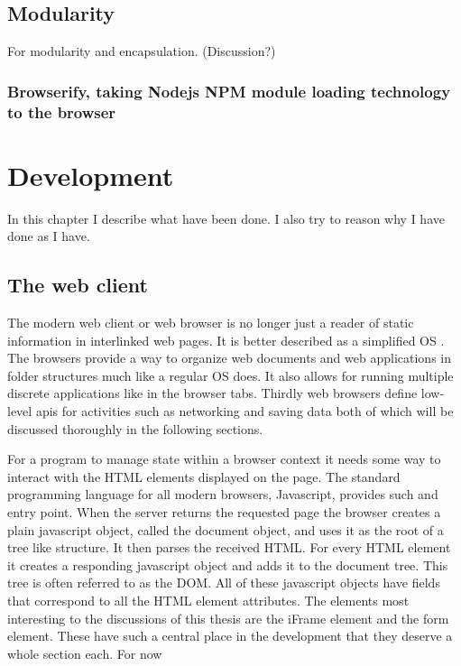\documentclass[english]{ifimaster}
\begin{document}
\section{Modularity}
For modularity and encapsulation. (Discussion?)
\subsection{Browserify, taking Nodejs NPM module loading technology to the browser}

\chapter{Development}
In this chapter I describe what have been done. I also try to reason why I have done as I have.

\section{The web client}
The modern web client or web browser is no longer just a reader of static information in interlinked web pages. It is better described as a simplified OS \parencite[p.310]{flanagan}. The browsers provide a way to organize web documents and web applications in folder structures much like a regular OS does. It also allows for running multiple discrete applications like in the browser tabs. Thirdly web browsers define low-level apis for activities such as networking and saving data both of which will be discussed thoroughly in the following sections.

For a program to manage state within a browser context it needs some way to interact with the HTML elements displayed on the page. The standard programming language for all modern browsers, Javascript, provides such and entry point. When the server returns the requested page the browser creates a plain javascript object, called the document object, and uses it as the root of a tree like structure. It then parses the received HTML. For every HTML element it creates a responding javascript object and adds it to the document tree. This tree is often referred to as the DOM. All of these javascript objects have fields that correspond to all the HTML element attributes. The elements most interesting to the discussions of this thesis are the iFrame element and the form element. These have such a central place in the development that they deserve a whole section each. For now  
\end{document}
